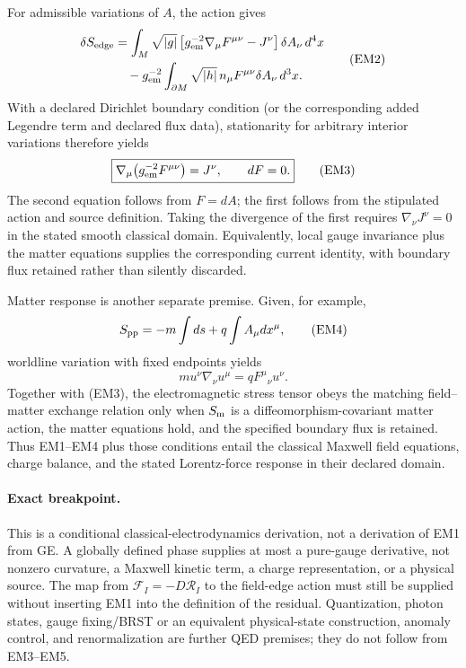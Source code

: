 \documentclass[11pt,a4paper]{article}
\theoremstyle{remark}
\begin{document}
For admissible variations of $A$, the action gives
\[
\begin{aligned}
 \delta S_{\rm edge}
 &=\int_M\sqrt{|g|}\left[
 g_{\rm em}^{-2}\nabla_\mu F^{\mu\nu}-J^\nu\right]\delta A_\nu\,d^4x\\
 &\quad-g_{\rm em}^{-2}\int_{\partial M}\sqrt{|h|}\,
 n_\mu F^{\mu\nu}\delta A_\nu\,d^3x.
\end{aligned}\tag{EM2}
\]
With a declared Dirichlet boundary condition (or the corresponding added
Legendre term and declared flux data), stationarity for arbitrary interior
variations therefore yields
\[
 \boxed{\nabla_\mu\bigl(g_{\rm em}^{-2}F^{\mu\nu}\bigr)=J^\nu,
 \qquad dF=0.}\tag{EM3}
\]
The second equation follows from $F=dA$; the first follows from the stipulated
action and source definition. Taking the divergence of the first requires
$\nabla_\nu J^\nu=0$ in the stated smooth classical domain. Equivalently,
local gauge invariance plus the matter equations supplies the corresponding
current identity, with boundary flux retained rather than silently discarded.

Matter response is another separate premise. Given, for example,
\[
 S_{\rm pp}=-m\int ds+q\int A_\mu dx^\mu,\tag{EM4}
\]
worldline variation with fixed endpoints yields
\[
 \boxed{m u^\nu\nabla_\nu u^\mu=qF^\mu{}_{\nu}u^\nu.}\tag{EM5}
\]
Together with (EM3), the electromagnetic stress tensor obeys the matching
field--matter exchange relation only when $S_{\rm m}$ is a
diffeomorphism-covariant matter action, the matter equations hold, and the
specified boundary flux is retained. Thus EM1--EM4 plus those conditions entail
the classical Maxwell field equations, charge balance, and the stated
Lorentz-force response in their declared domain.

\paragraph{Exact breakpoint.}
This is a conditional classical-electrodynamics derivation, not a derivation of
EM1 from GE. A globally defined phase supplies at most a pure-gauge derivative,
not nonzero curvature, a Maxwell kinetic term, a charge representation, or a
physical source. The map from $\mathcal F_I=-D\mathcal R_I$ to the field-edge
action must still be supplied without inserting EM1 into the definition of the
residual. Quantization, photon states, gauge fixing/BRST or an equivalent
physical-state construction, anomaly control, and renormalization are further
QED premises; they do not follow from EM3--EM5.
\end{document}
